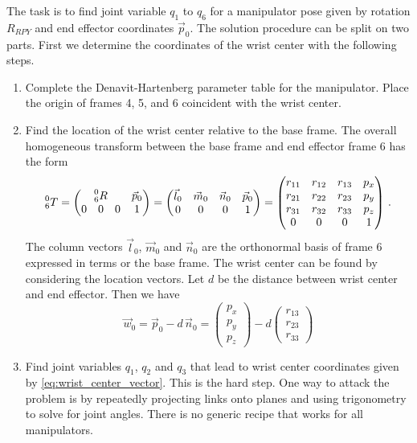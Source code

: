 \documentclass[11pt, onecolumn, oneside, reqno]{article}
\begin{document}
The task is to find joint variable $q_1$ to $q_6$ for a manipulator pose given by rotation $R_{RPY}$ and end effector coordinates $\vec{p}_0$. The solution procedure can be split on two parts. First we determine the coordinates of the wrist center with the following steps.
\begin{enumerate}
\item Complete the Denavit-Hartenberg parameter table for the manipulator. Place the origin of frames 4, 5, and 6 coincident with the wrist center.
\item Find the location of the wrist center relative to the base frame. The overall homogeneous transform between the base frame and end effector frame 6 has the form
\begin{equation}
\prescript{0}{6} T =
\begin{pmatrix}
\multicolumn{3}{c}{\prescript{0}{6} R} & \vec{p}_0 \\
0 & 0 & 0 & 1
\end{pmatrix}
=
\begin{pmatrix}
\vec{l}_0 & \vec{m}_0 & \vec{n}_0 & \vec{p}_0 \\
        0 &         0 &         0 &         1
\end{pmatrix}
=
\begin{pmatrix}
r_{11} & r_{12} & r_{13} & p_x \\
r_{21} & r_{22} & r_{23} & p_y \\
r_{31} & r_{32} & r_{33} & p_z \\
0 & 0 & 0 & 1
\end{pmatrix} \, .
\end{equation}
The column vectors $\vec{l}_0$, $\vec{m}_0$ and $\vec{n}_0$  are the orthonormal basis of frame 6 expressed in terms or the base frame. The wrist center can be found by considering the location vectors. Let $d$ be the distance between wrist center and end effector. Then we have
\begin{equation}
\label{eq:wrist_center_vector}
\vec{w}_0 = \vec{p}_0 - d \, \vec{n}_0
=
\begin{pmatrix}
p_x \\
p_y \\
p_z
\end{pmatrix}
- d
\begin{pmatrix}
r_{13} \\
r_{23} \\
r_{33}
\end{pmatrix}
\end{equation}
\item Find joint variables $q_1$, $q_2$ and $q_3$ that lead to wrist center coordinates given by \ref{eq:wrist_center_vector}. This is the hard step. One way to attack the problem is by repeatedly projecting links onto planes and using trigonometry to solve for joint angles. There is no generic recipe that works for all manipulators.
\end{enumerate}
\end{document}
